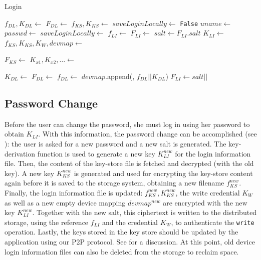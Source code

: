 \begin{algorithm}
\caption{Login}
\begin{algorithmic}[\LineNumFrequency]
\State $f_{DL},K_{DL} \gets$ \DeviceLocalRead
{} 
   \State $F_{DL} \gets$ 
   \State $f_{KS},K_{KS} \gets$ 
   \State $saveLoginLocally \gets$ \texttt{False}
\Else {}
   \State $uname \gets$ 
   \State $passwd \gets$ 
   \State $saveLoginLocally \gets$ 
   \State $f_{LI} \gets$ 
   \State $F_{LI} \gets$ 
   \State $salt \gets F_{LI}.salt$  
   \State $K_{LI} \gets$ 
   \State $f_{KS}, K_{KS}, K_W, devmap \gets$ 
\EndIf

\State $F_{KS} \gets$ 
\State $K_{x1},K_{x2},\dots \gets$ 

   \State $K_{DL} \gets$ \NewKey
   \State $F_{DL} \gets$ 
   \State $f_{DL} \gets$ 
   \State {}
   \State $devmap$.append(\DeviceID, $f_{DL} || K_{DL}$)
   \State $F_{LI} \gets salt || $
   \State {} 
\EndIf

\end{algorithmic}
\end{algorithm}

\subsection{Password Change} 
Before the user can change the password, she must log in using her password to obtain $K_{LI}$.
With this information, the password change can be accomplished (see
): the user is asked for a new password and a new salt is generated. The key-derivation function is used to generate a new key $K_{LI}^{new}$ for the login information file. Then, the content of the key-store file is fetched and decrypted (with the old key). A new key $K_{KS}^{new}$ is generated and used for encrypting the key-store content again before it is saved to the storage system, obtaining a new filename $f_{KS}^{new}$. Finally, the login information file is updated: $f_{KS}^{new}, K_{KS}^{new}$, the write credential $K_W$ as well as a new empty device mapping $devmap^{new}$ are encrypted with the new key $K_{LI}^{new}$. Together with the new salt, this ciphertext is written to the distributed storage, using the reference $f_{LI}$ and the credential $K_W$, to authenticate the \texttt{write} operation.
Lastly, the keys stored in the key store should be updated by the application
using our P2P protocol. See  for a discussion. At this
point, old device login information files can also be deleted from the storage to
reclaim space.

